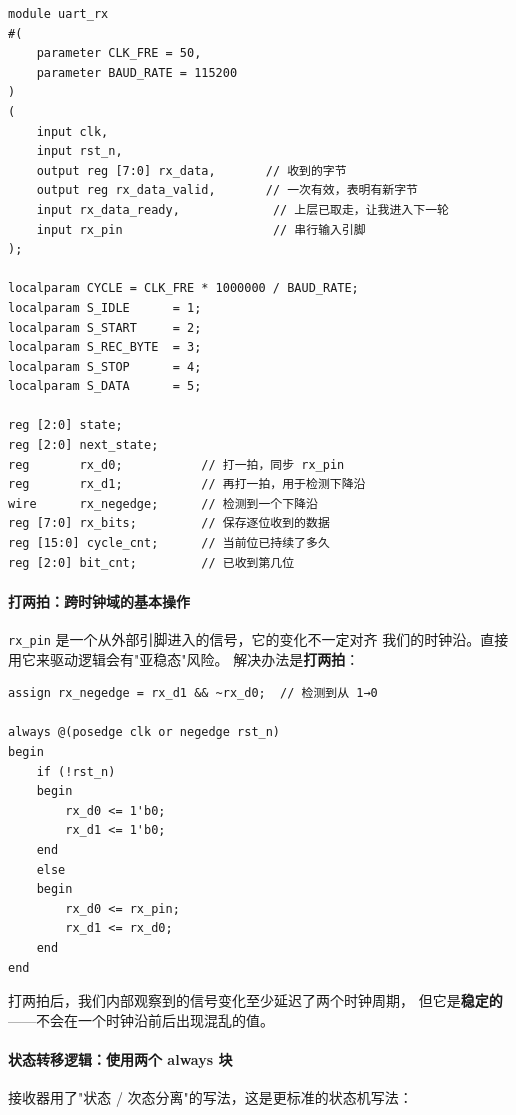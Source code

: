 \begin{lstlisting}[style=verilog,caption=Chip/src/uart\_rx.v]
module uart_rx
#(
    parameter CLK_FRE = 50,
    parameter BAUD_RATE = 115200
)
(
    input clk,
    input rst_n,
    output reg [7:0] rx_data,       // 收到的字节
    output reg rx_data_valid,       // 一次有效，表明有新字节
    input rx_data_ready,             // 上层已取走，让我进入下一轮
    input rx_pin                     // 串行输入引脚
);

localparam CYCLE = CLK_FRE * 1000000 / BAUD_RATE;
localparam S_IDLE      = 1;
localparam S_START     = 2;
localparam S_REC_BYTE  = 3;
localparam S_STOP      = 4;
localparam S_DATA      = 5;

reg [2:0] state;
reg [2:0] next_state;
reg       rx_d0;           // 打一拍，同步 rx_pin
reg       rx_d1;           // 再打一拍，用于检测下降沿
wire      rx_negedge;      // 检测到一个下降沿
reg [7:0] rx_bits;         // 保存逐位收到的数据
reg [15:0] cycle_cnt;      // 当前位已持续了多久
reg [2:0] bit_cnt;         // 已收到第几位
\end{lstlisting}

\paragraph{打两拍：跨时钟域的基本操作}
\texttt{rx\_pin} 是一个从外部引脚进入的信号，它的变化不一定对齐
我们的时钟沿。直接用它来驱动逻辑会有"亚稳态"风险。
解决办法是\textbf{打两拍}：

\begin{lstlisting}[style=verilog]
assign rx_negedge = rx_d1 && ~rx_d0;  // 检测到从 1→0

always @(posedge clk or negedge rst_n)
begin
    if (!rst_n)
    begin
        rx_d0 <= 1'b0;
        rx_d1 <= 1'b0;
    end
    else
    begin
        rx_d0 <= rx_pin;
        rx_d1 <= rx_d0;
    end
end
\end{lstlisting}

打两拍后，我们内部观察到的信号变化至少延迟了两个时钟周期，
但它是\textbf{稳定的}——不会在一个时钟沿前后出现混乱的值。

\paragraph{状态转移逻辑：使用两个 always 块}
接收器用了"状态 / 次态分离"的写法，这是更标准的状态机写法：

